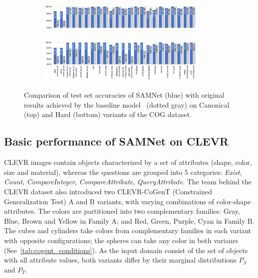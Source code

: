 \begin{figure}[t!]
	\centering
	\begin{subfigure}{\textwidth}
		\centering
		\includegraphics[width=0.9\textwidth]{../img/plots/cog_canonical_baseline_no_labels.pdf}
	\end{subfigure}%
	\newline
	\begin{subfigure}{\textwidth}
		\centering
		\includegraphics[width=0.9\textwidth]{../img/plots/cog_hard_baseline_labels.pdf}
	\end{subfigure}%
	\caption{Comparison of test set accuracies of SAMNet (blue) with original results achieved by the baseline model~\cite{yang2018dataset} (dotted gray) on Canonical (top) and Hard (bottom) variants of the COG dataset.}
	\label{fig:samnet_cog_detailed}
\end{figure}

\subsection{Basic performance of SAMNet on CLEVR}
\label{sec:clevr-baseline-compare}
CLEVR images contain objects characterized by a set of attributes (shape, color, size and material), whereas the questions are grouped into 5 categories: \textit{Exist}, \textit{Count}, \textit{CompareInteger}, \textit{CompareAttribute}, \textit{QueryAttribute}.
The team behind the CLEVR dataset also introduced two CLEVR-CoGenT (Constrained Generalization Test) A and B variants, with varying combinations of color-shape attributes.
The colors are partitioned into two complementary families:
Gray, Blue, Brown and Yellow in Family A; and Red, Green, Purple, Cyan in Family B.
The cubes and cylinders take colors from complementary families in each variant with opposite configurations; the spheres can take any color in both varianrs (See~\cref{tab:cogent_conditions}).
As the input domain consist of the set of objects with all attribute values, both variants differ by their marginal distributions $P_S$ and $P_T$.

